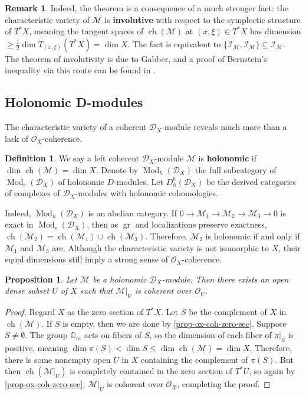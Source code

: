 \documentclass[11pt, a4paper]{article}
\newtheorem{proposition}[theorem]{Proposition}
\theoremstyle{definition}
\newtheorem{remark}[theorem]{Remark}
\newtheorem{definition}[theorem]{Definition}
\newcommand{\gr}{\operatorname{gr}}
\newcommand{\Mod}{\operatorname{Mod}}
\newcommand{\ch}{\operatorname{ch}}
\begin{document}
    \begin{remark}
        Indeed, the theorem is a consequence of a much stronger fact: the characteristic variety of $\mathcal M$ is \textbf{involutive} with respect to the symplectic structure of $T^*X$, meaning the tangent spaces of $\ch(\mathcal M)$ at $(x,\xi)\in T^*X$ has dimension $\geqslant \frac{1}{2}\dim T_{(x,\xi)}(T^*X)=\dim X$. The fact is equivalent to $\{\mathcal I_{\mathcal M},\mathcal I_{\mathcal M}\}\subseteq\mathcal I_{\mathcal M}$. The theorem of involutivity is due to Gabber, and a proof of Bernstein's inequality via this route can be found in \cite{ginzburg-notes}.
    \end{remark}




    \subsection{Holonomic D-modules}
    The characteristic variety of a coherent $\mathcal D_X$-module reveals much more than a lack of $\mathcal O_X$-coherence.
    \begin{definition}
        We say a left coherent $\mathcal D_X$-module $\mathcal M$ is \textbf{holonomic} if $\dim\ch(\mathcal M)=\dim X$. Denote by $\Mod_h(\mathcal D_X)$ the full subcategory of $\Mod_c(\mathcal D_X)$ of holonomic $D$-modules. Let $D^b_h(\mathcal D_X)$ be the derived categories of complexes of $\mathcal D_X$-modules with holonomic cohomologies.
    \end{definition}
    Indeed, $\Mod_h(\mathcal D_X)$ is an abelian category. If $0\to\mathcal M_1\to\mathcal M_2\to\mathcal M_3\to 0$ is exact in $\Mod_c(\mathcal D_X)$, then as $\gr$ and localizations preserve exactness, $\ch(\mathcal M_2)=\ch(\mathcal M_1)\cup\ch(\mathcal M_3)$. Therefore, $\mathcal M_2$ is holonomic if and only if $\mathcal M_1$ and $\mathcal M_3$ are. Although the characteristic variety is not isomorphic to $X$, their equal dimensions still imply a strong sense of $\mathcal O_X$-coherence.
    \begin{proposition}
        Let $\mathcal M$ be a holonomic $\mathcal D_X$-module. Then there exists an open dense subset $U$ of $X$ such that $\mathcal M|_U$ is coherent over $\mathcal O_U$.
    \end{proposition}
    \begin{proof}
        Regard $X$ as the zero section of $T^*X$. Let $S$ be the complement of $X$ in $\ch(\mathcal M)$. If $S$ is empty, then we are done by \cref{prop-ox-coh-zero-sec}. Suppose $S\neq\emptyset$. The group $\mathbb G_m$ acts on fibers of $S$, so the dimension of each fiber of $\pi|_S$ is positive, meaning $\dim\pi(S)<\dim S\leqslant \dim\ch(\mathcal M)=\dim X$. Therefore, there is some nonempty open $U$ in $X$ containing the complement of $\pi(S)$. But then $\ch(\mathcal M|_U)$ is completely contained in the zero section of $T^*U$, so again by \cref{prop-ox-coh-zero-sec}, $\mathcal M|_U$ is coherent over $\mathcal O_X$, completing the proof.
    \end{proof}
\end{document}
